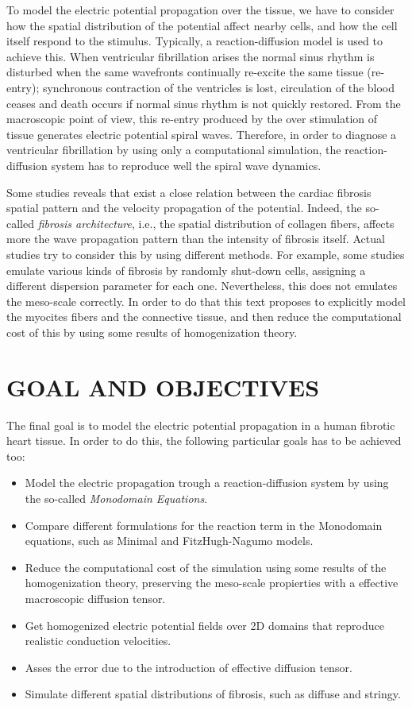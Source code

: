 \documentclass[letterpaper, 11pt, twoside]{article}
\begin{document}
To model the electric potential propagation over the tissue, we have to consider how the spatial distribution of the potential affect nearby cells, and how the cell itself respond to the stimulus. Typically, a reaction-diffusion model is used to achieve this. When ventricular fibrillation arises the normal sinus rhythm is disturbed when the same wavefronts continually re-excite the same tissue (re-entry); synchronous contraction of the ventricles is lost, circulation of the blood ceases and death occurs if normal sinus rhythm is not quickly restored. From the macroscopic point of view, this re-entry produced by the over stimulation of tissue generates electric potential spiral waves. Therefore, in order to diagnose a ventricular fibrillation by using only a computational simulation, the reaction-diffusion system has to reproduce well the spiral wave dynamics.

Some studies reveals that exist a close relation between the cardiac fibrosis spatial pattern and the velocity propagation of the potential. Indeed, the so-called \textsl{fibrosis architecture}, i.e., the spatial distribution of collagen fibers, affects more the wave propagation pattern than the intensity of fibrosis itself. Actual studies try to consider this by using different methods. For example, some studies emulate various kinds of fibrosis by randomly shut-down cells, assigning a different dispersion parameter for each one. Nevertheless, this does not emulates the meso-scale correctly. In order to do that this text proposes to explicitly model the myocites fibers and the connective tissue, and then reduce the computational cost of this by using some results of homogenization theory.


\section{GOAL AND OBJECTIVES}

The final goal is to model the electric potential propagation in a human fibrotic heart tissue. In order to do this, the following particular goals has to be achieved too:

\begin{itemize}
\item Model the electric propagation trough a reaction-diffusion system by using the so-called \textsl{Monodomain Equations}.
\item Compare different formulations for the reaction term in the Monodomain equations, such as Minimal and FitzHugh-Nagumo models.
\item Reduce the computational cost of the simulation using some results of the homogenization theory, preserving the meso-scale propierties with a effective macroscopic diffusion tensor.
\item Get homogenized electric potential fields over 2D domains that reproduce realistic conduction velocities.
\item Asses the error due to the introduction of effective diffusion tensor.
\item Simulate different spatial distributions of fibrosis, such as diffuse and stringy.
\end{itemize}










\end{document}
